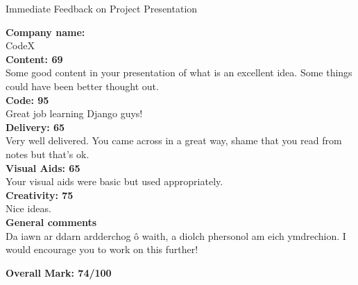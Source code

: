 \documentclass{article}
\begin{document}
\begin{center}
\Huge{Immediate Feedback on Project Presentation}\\
\end{center}


\normalsize
\textbf{Company name:}\\

CodeX \\

\textbf{Content: 69}\\

Some good content in your presentation of what is an excellent idea.
Some things could have been better thought out.\\

\textbf{Code: 95}\\

Great job learning Django guys!\\

\textbf{Delivery: 65}\\

Very well delivered.
You came across in a great way, shame that you read from notes but that's ok.\\

\textbf{Visual Aids: 65}\\

Your visual aids were basic but used appropriately.\\

\textbf{Creativity: 75}\\

Nice ideas.\\

\textbf{General comments}\\

Da iawn ar ddarn ardderchog \^{o} waith, a diolch phersonol am eich ymdrechion.
I would encourage you to work on this further!


\textbf{Overall Mark: 74/100}
\end{document}
